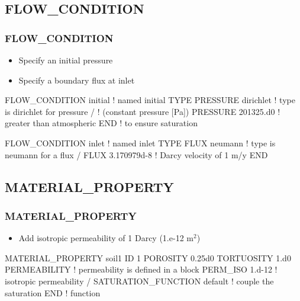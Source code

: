 \documentclass{beamer}
\newcommand\redcomment[1]{{{\color{red} #1}}}
\newcommand\bluecomment[1]{{{\color{blue} #1}}}
\newcommand\greencomment[1]{{{\color{green} #1}}}
\newcommand\magentacomment[1]{{{\color{magenta} #1}}}
\begin{document}
\subsection{FLOW\_CONDITION}

\begin{frame}[fragile]\frametitle{FLOW\_CONDITION}

\begin{itemize}
\item Specify an initial pressure
\item Specify a boundary flux at inlet
\end{itemize}

\begin{semiverbatim}
FLOW_CONDITION initial   \bluecomment{! named \greencomment{initial}}
  TYPE
    PRESSURE dirichlet   \bluecomment{! type is \redcomment{dirichlet} for pressure}
  /                      \bluecomment{!   (constant pressure [Pa])}
  PRESSURE 201325.d0     \bluecomment{! greater than atmospheric}
END                      \bluecomment{!   to ensure saturation}

FLOW_CONDITION inlet      \bluecomment{! named \greencomment{inlet}}
  TYPE
    FLUX neumann          \bluecomment{! type is \redcomment{neumann} for a flux}
  /
  FLUX 3.170979d-8        \bluecomment{! Darcy velocity of 1 m/y}
END
\end{semiverbatim}

\end{frame}

\subsection{MATERIAL\_PROPERTY}

\begin{frame}[fragile]\frametitle{MATERIAL\_PROPERTY}

\begin{itemize}
\item Add isotropic permeability of 1 Darcy (1.e-12 m$^2$)
\end{itemize}

\begin{semiverbatim}
MATERIAL_PROPERTY soil1
  ID 1
  POROSITY 0.25d0
  TORTUOSITY 1.d0
  \magentacomment{PERMEABILITY}     \bluecomment{! permeability is defined in a block}
    \magentacomment{PERM_ISO 1.d-12}  \bluecomment{! isotropic permeability}
  \magentacomment{/}
  \magentacomment{SATURATION_FUNCTION default}  \bluecomment{! couple the saturation}
END                            \bluecomment{!   function}
\end{semiverbatim}

\end{frame}
\end{document}
